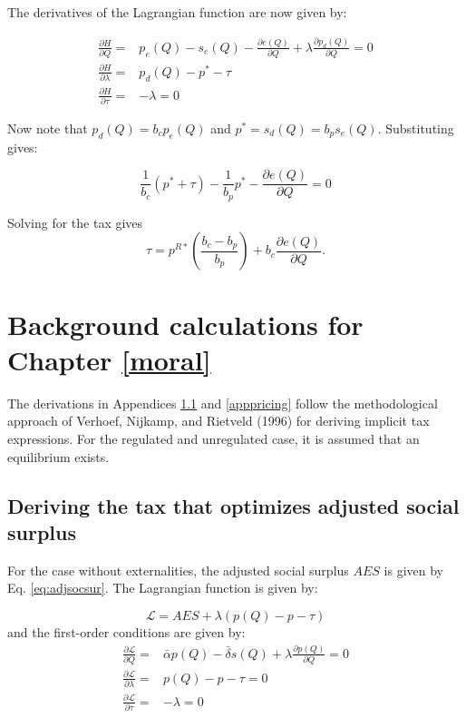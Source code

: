 \documentclass[
]{book}
\begin{document}
The derivatives of the Lagrangian function are now given by:

\begin{align}
  \frac{\partial H}{\partial Q} =& p_e(Q) - s_e(Q) -\frac{\partial e(Q)}{\partial Q} + \lambda \frac{\partial p_d(Q)}{\partial Q} = 0 \\
  \frac{\partial H}{\partial \lambda} =& p_d (Q) - p^* - \tau \\
  \frac{\partial H}{\partial \tau} =& -\lambda  =0
\end{align}

Now note that \(p_d (Q)=b_c p_e (Q)\) and \(p^*=s_d (Q)=b_p s_e (Q)\). Substituting gives:

\begin{equation}
\frac{1}{b_c} (p^* + \tau) - \frac{1}{b_p}p^* -\frac{\partial e(Q)}{\partial Q} = 0
\end{equation}

Solving for the tax gives
\begin{equation}
\tau = p^{R*} \left(\frac{b_c - b_p}{b_p}\right) + b_c \frac{\partial e(Q)}{\partial Q}.
\end{equation}

\hypertarget{background-calculations-for-chapter-refmoral}{%
\chapter{Background calculations for Chapter \ref{moral}}\label{background-calculations-for-chapter-refmoral}}

The derivations in Appendices \ref{apptax} and \ref{apppricing} follow the methodological approach of Verhoef, Nijkamp, and Rietveld (1996) for deriving implicit tax expressions. For the regulated and unregulated case, it is assumed that an equilibrium exists.

\hypertarget{apptax}{%
\section{Deriving the tax that optimizes adjusted social surplus}\label{apptax}}

For the case without externalities, the adjusted social surplus \(AES\) is given by Eq. \eqref{eq:adjsocsur}. The Lagrangian function is given by:

\begin{equation}
\mathcal{L} = AES  + \lambda(p(Q) - p - \tau)
\end{equation}
and the first-order conditions are given by:
\begin{align}
  \frac{\partial \mathcal{L}}{\partial Q} =& \bar{\alpha} p(Q) - \bar{\delta} s(Q) + \lambda \frac{\partial p(Q)}{\partial Q} = 0 \label{eq:apptax1}\\
  \frac{\partial \mathcal{L}}{\partial \lambda} =& p(Q) - p - \tau = 0 \label{eq:apptax2}\\
  \frac{\partial \mathcal{L}}{\partial \tau} =& - \lambda = 0 \label{eq:apptax3}
\end{align}
\end{document}
